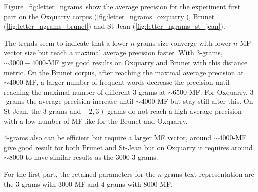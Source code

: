 Figure~\ref{fig:letter_ngrams} show the average precision for the experiment first part on the Oxquarry corpus (\ref{fig:letter_ngrams_oxquarry}), Brunet (\ref{fig:letter_ngrams_brunet}) and St-Jean (\ref{fig:letter_ngrams_st_jean}).

The trends seem to indicate that a lower $n$-grams size converge with lower $n$-MF vector size but reach a maximal average precision faster.
With $3$-grams, $\sim 3000-4000$-MF give good results on Oxquarry and Brunet with this distance metric.
On the Brunet corpus, after reaching the maximal average precision at $\sim 4000$-MF, a larger number of frequent words decrease the precision until reaching the maximal number of different $3$-grams at $\sim 6500$-MF.
For Oxquarry, $3$-grams the average precision increase until $\sim 4000$-MF but stay still after this.
On St-Jean, the $3$-grams and $(2,3)$-grams do not reach a high average precision with a low number of MF like for the Brunet and Oxquarry.

$4$-grams also can be efficient but require a larger MF vector, around $\sim 4000$-MF give good result for both Brunet and St-Jean but on Oxquarry it requires around $\sim 8000$ to have similar results as the $3000$ $3$-grams.

For the first part, the retained parameters for the $n$-grams text representation are the $3$-grams with $3000$-MF and $4$-grams with $8000$-MF.

